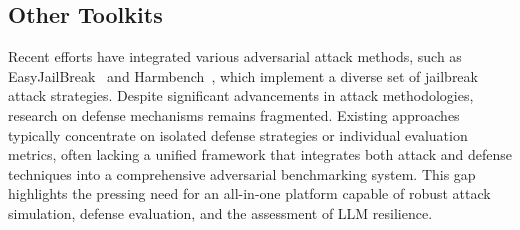 \subsection{Other Toolkits}
Recent efforts have integrated various adversarial attack methods, such as EasyJailBreak~\cite{zhou2024easyjailbreak} and Harmbench~\cite{DBLP:conf/icml/MazeikaPYZ0MSLB24}, which implement a diverse set of jailbreak attack strategies. Despite significant advancements in attack methodologies, research on defense mechanisms remains fragmented. Existing approaches typically concentrate on isolated defense strategies or individual evaluation metrics, often lacking a unified framework that integrates both attack and defense techniques into a comprehensive adversarial benchmarking system. This gap highlights the pressing need for an all-in-one platform capable of robust attack simulation, defense evaluation, and the assessment of LLM resilience.

